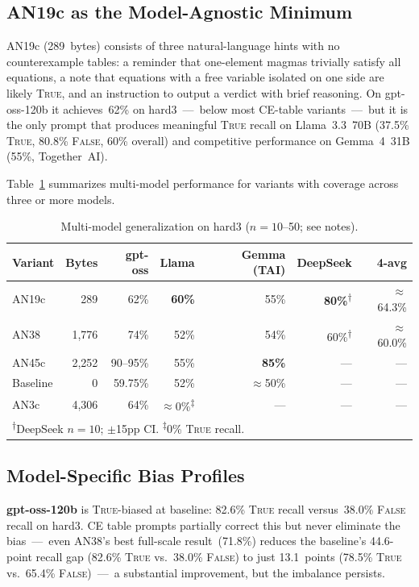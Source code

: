 \documentclass[11pt]{article}
\begin{document}
\subsection{AN19c as the Model-Agnostic Minimum}

AN19c (289~bytes) consists of three natural-language hints with no
counterexample tables: a reminder that one-element magmas trivially
satisfy all equations, a note that equations with a free variable
isolated on one side are likely \textsc{True}, and an instruction to
output a verdict with brief reasoning. On gpt-oss-120b it achieves~62\%
on hard3~---~below most CE-table variants~---~but it is the only prompt
that produces meaningful \textsc{True} recall on Llama~3.3~70B (37.5\%
\textsc{True}, 80.8\% \textsc{False}, 60\% overall) and competitive
performance on Gemma~4~31B (55\%, Together~AI).

Table~\ref{tab:multimodel4} summarizes multi-model performance for
variants with coverage across three or more models.

\begin{table}[h]
\centering
\caption{Multi-model generalization on hard3 ($n=10$--50; see notes).}
\label{tab:multimodel4}
\small
\begin{tabular}{lrrrrrr}
\toprule
Variant & Bytes & gpt-oss & Llama & Gemma (TAI) & DeepSeek & 4-avg \\
\midrule
AN19c   & 289   & 62\% & \textbf{60\%} & 55\% & \textbf{80\%}\textsuperscript{$\dagger$} & $\approx$64.3\% \\
AN38    & 1{,}776 & 74\% & 52\% & 54\% & 60\%\textsuperscript{$\dagger$} & $\approx$60.0\% \\
AN45c   & 2{,}252 & 90--95\% & 55\% & \textbf{85\%} & --- & --- \\
Baseline & 0   & 59.75\% & 52\% & $\approx$50\% & --- & --- \\
AN3c    & 4{,}306 & 64\% & $\approx$0\%\textsuperscript{$\ddagger$} & --- & --- & --- \\
\bottomrule
\multicolumn{7}{l}{\textsuperscript{$\dagger$}DeepSeek $n=10$; $\pm$15pp CI.
  \textsuperscript{$\ddagger$}0\% \textsc{True} recall.}
\end{tabular}
\end{table}

\subsection{Model-Specific Bias Profiles}

\textbf{gpt-oss-120b} is \textsc{True}-biased at baseline: 82.6\%
\textsc{True} recall versus~38.0\% \textsc{False} recall on hard3. CE
table prompts partially correct this but never eliminate the bias~---~even
AN38's best full-scale result~(71.8\%) reduces the baseline's 44.6-point
recall gap (82.6\% \textsc{True} vs.\ 38.0\% \textsc{False}) to just
13.1~points (78.5\% \textsc{True} vs.\ 65.4\% \textsc{False})~---~a
substantial improvement, but the imbalance persists.
\end{document}
